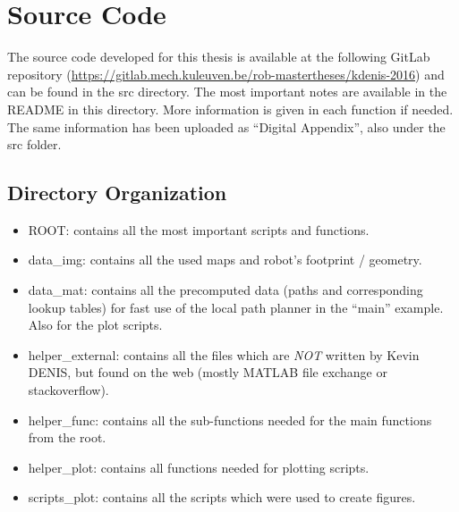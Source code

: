 \chapter{Source Code}\label{app:SourceCode}
The source code developed for this thesis is available at the following GitLab repository \cite{Denis2017} (\url{https://gitlab.mech.kuleuven.be/rob-mastertheses/kdenis-2016}) 
and can be found in the src directory. The most important notes are available in the README in this directory. More information is given in each function if needed. The same information has been uploaded as ``Digital Appendix'', also under the src folder. 

\section{Directory Organization}
\begin{itemize}
\tightlist
\item ROOT: contains all the most important scripts and functions.
\item data\_img: contains all the used maps and robot's footprint / geometry.
\item data\_mat: contains all the precomputed data (paths and corresponding lookup tables) for fast use of the local path planner in  the ``main'' example. Also for the plot scripts.
\item helper\_external:  contains all the files which are \emph{NOT} written by Kevin DENIS, but found on the web (mostly MATLAB file exchange or stackoverflow).
\item helper\_func: contains all the sub-functions needed for the main functions from the root.
\item helper\_plot: contains all functions needed for plotting scripts.
\item scripts\_plot: contains all the scripts which were used to create  figures.
\end{itemize}
